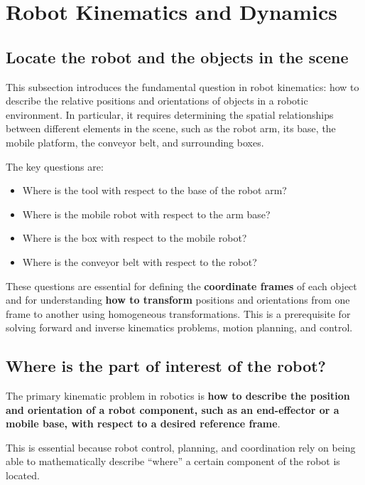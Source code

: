 \section{Robot Kinematics and Dynamics}

\subsection{Locate the robot and the objects in the scene}

This subsection introduces the fundamental question in robot kinematics: how to describe the relative positions and orientations of objects in a robotic environment. In particular, it requires determining the spatial relationships between different elements in the scene, such as the robot arm, its base, the mobile platform, the conveyor belt, and surrounding boxes.

The key questions are:

\begin{itemize}
  \item Where is the tool with respect to the base of the robot arm?
  \item Where is the mobile robot with respect to the arm base?
  \item Where is the box with respect to the mobile robot?
  \item Where is the conveyor belt with respect to the robot?
\end{itemize}

These questions are essential for defining the \textbf{coordinate frames} of each object and for understanding \textbf{how to transform} positions and orientations from one frame to another using homogeneous transformations. This is a prerequisite for solving forward and inverse kinematics problems, motion planning, and control.

\hfill

\subsection{Where is the part of interest of the robot?}

The primary kinematic problem in robotics is \textbf{how to describe the position and orientation of a robot component, such as an end-effector or a mobile base, with respect to a desired reference frame}.

This is essential because robot control, planning, and coordination rely on being able to mathematically describe “where” a certain component of the robot is located.

